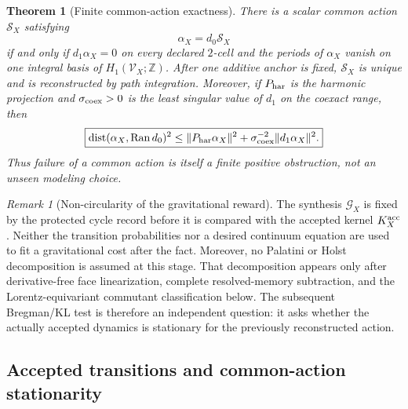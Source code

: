 \documentclass[11pt]{article}
\newtheorem{theorem}{Theorem}[section]
\theoremstyle{definition}
\theoremstyle{remark}
\newtheorem{remark}[remark]{Remark}
\newcommand{\Z}{\mathbb Z}
\newcommand{\Ran}{\operatorname{Ran}}
\begin{document}
\begin{theorem}[Finite common-action exactness]
\label{thm:main-common-action}
There is a scalar common action $\mathscr S_X$ satisfying
\begin{equation}
 \boxed{\alpha_X=d_0\mathscr S_X}
 \label{eq:main-common-action}
\end{equation}
if and only if $d_1\alpha_X=0$ on every declared $2$-cell and the periods of
$\alpha_X$ vanish on one integral basis of $H_1(\mathscr V_X;\Z)$.  After one
additive anchor is fixed, $\mathscr S_X$ is unique and is reconstructed by path
integration.  Moreover, if $P_{\rm har}$ is the harmonic projection and
$\sigma_{\rm coex}>0$ is the least singular value of $d_1$ on the coexact
range, then
\begin{equation}
 \boxed{
 \operatorname{dist}(\alpha_X,\Ran d_0)^2
 \le \|P_{\rm har}\alpha_X\|^2
 +\sigma_{\rm coex}^{-2}\|d_1\alpha_X\|^2.}
 \label{eq:main-common-action-obstruction}
\end{equation}
Thus failure of a common action is itself a finite positive obstruction, not an
unseen modeling choice.
\end{theorem}

\begin{remark}[Non-circularity of the gravitational reward]
\label{rem:main-gravitational-reward-noncircular}
The synthesis $\mathscr G_X$ is fixed by the protected cycle record before it is
compared with the accepted kernel $K_X^{\rm acc}$.  Neither the transition
probabilities nor a desired continuum equation are used to fit a gravitational
cost after the fact.  Moreover, no Palatini or Holst decomposition is assumed at
this stage.  That decomposition appears only after derivative-free face
linearization, complete resolved-memory subtraction, and the Lorentz-equivariant
commutant classification below.  The subsequent Bregman/KL test is therefore an
independent question: it asks whether the actually accepted dynamics is
stationary for the previously reconstructed action.
\end{remark}

\subsection{Accepted transitions and common-action stationarity}
\end{document}

